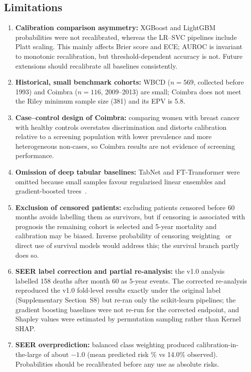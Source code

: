 \documentclass[11pt,a4paper]{article}
\begin{document}
\subsection{Limitations}\label{sec:limitations}
\begin{enumerate}[leftmargin=*]
\item \textbf{Calibration comparison asymmetry:} XGBoost and LightGBM probabilities were not recalibrated, whereas the LR--SVC pipelines include Platt scaling. This mainly affects Brier score and ECE; AUROC is invariant to monotonic recalibration, but threshold-dependent accuracy is not. Future extensions should recalibrate all baselines consistently.
\item \textbf{Historical, small benchmark cohorts:} WBCD ($n=569$, collected before 1993) and Coimbra ($n=116$, 2009--2013) are small; Coimbra does not meet the Riley minimum sample size (381) and its EPV is 5.8.
\item \textbf{Case--control design of Coimbra:} comparing women with breast cancer with healthy controls overstates discrimination and distorts calibration relative to a screening population with lower prevalence and more heterogeneous non-cases, so Coimbra results are not evidence of screening performance.
\item \textbf{Omission of deep tabular baselines:} TabNet and FT-Transformer were omitted because small samples favour regularised linear ensembles and gradient-boosted trees~\cite{shwartz2022}.
\item \textbf{Exclusion of censored patients:} excluding patients censored before 60 months avoids labelling them as survivors, but if censoring is associated with prognosis the remaining cohort is selected and 5-year mortality and calibration may be biased. Inverse probability of censoring weighting~\cite{vock2016} or direct use of survival models would address this; the survival branch partly does so.
\item \textbf{SEER label correction and partial re-analysis:} the v1.0 analysis labelled 158 deaths after month 60 as 5-year events. The corrected re-analysis reproduced the v1.0 fold-level results exactly under the original label (Supplementary Section~S8) but re-ran only the scikit-learn pipelines; the gradient boosting baselines were not re-run for the corrected endpoint, and Shapley values were estimated by permutation sampling rather than Kernel SHAP.
\item \textbf{SEER overprediction:} balanced class weighting produced calibration-in-the-large of about $-1.0$ (mean predicted risk \seerMeanPred\% vs 14.0\% observed). Probabilities should be recalibrated before any use as absolute risks.

\end{enumerate}
\end{document}
